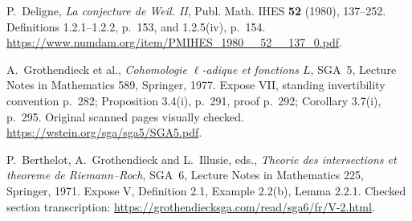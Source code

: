 P.~Deligne, \emph{La conjecture de Weil. II},
Publ. Math. IHES \textbf{52} (1980), 137--252.
Definitions 1.2.1--1.2.2, p.~153, and 1.2.5(iv), p.~154.
\url{https://www.numdam.org/item/PMIHES_1980__52__137_0.pdf}.

A.~Grothendieck et al., \emph{Cohomologie $\ell$-adique et fonctions $L$},
SGA~5, Lecture Notes in Mathematics 589, Springer, 1977.
Expose VII, standing invertibility convention p.~282; Proposition 3.4(i), p.~291, proof p.~292; Corollary 3.7(i), p.~295. Original scanned pages visually checked.
\url{https://wstein.org/sga/sga5/SGA5.pdf}.

P.~Berthelot, A.~Grothendieck and L.~Illusie, eds.,
\emph{Theorie des intersections et theoreme de Riemann--Roch},
SGA~6, Lecture Notes in Mathematics 225, Springer, 1971.
Expose V, Definition 2.1, Example 2.2(b), Lemma 2.2.1.
Checked section transcription:
\url{https://grothendiecksga.com/read/sga6/fr/V-2.html}.
